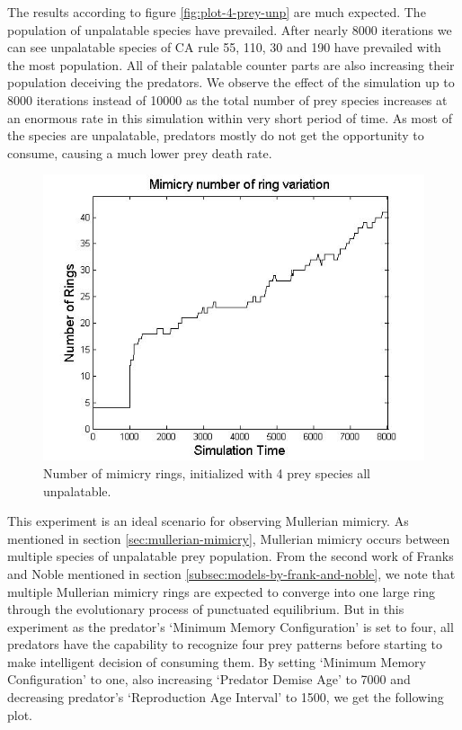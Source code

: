 \documentclass[letterpaper]{article}
\numberwithin{equation}{section}
\begin{document}
The results according to figure \ref{fig:plot-4-prey-unp} are much expected. The population of unpalatable species have prevailed. After nearly 8000 iterations we can see unpalatable species of CA rule 55, 110, 30 and 190 have prevailed with the most population. All of their palatable counter parts are also increasing their population deceiving the predators. We observe the effect of the simulation up to 8000 iterations instead of 10000 as the total number of prey species increases at an enormous rate in this simulation within very short period of time. As most of the species are unpalatable, predators mostly do not get the opportunity to consume, causing a much lower prey death rate. 

\begin{figure}[H]
	\centering
	\includegraphics[scale=0.50]{../tex/images/ringSize8k-4Prey-unp}
	\caption[Number of mimicry rings (4 prey species all unpalatable)]{Number of mimicry rings, initialized with 4 prey species all unpalatable.}
	\label{fig:ringSize10k-4-Prey-unp}
\end{figure}

This experiment is an ideal scenario for observing Mullerian mimicry. As mentioned in section \ref{sec:mullerian-mimicry}, Mullerian mimicry occurs between multiple species of unpalatable prey population. From the second work of Franks and Noble \cite{franks2003} mentioned in section \ref{subsec:models-by-frank-and-noble}, we note that multiple Mullerian mimicry rings are expected to converge into one large ring through the evolutionary process of punctuated equilibrium. But in this experiment as the predator's `Minimum Memory Configuration' is set to four, all predators have the capability to recognize four prey patterns before starting to make intelligent decision of consuming them. By setting `Minimum Memory Configuration' to one, also increasing `Predator Demise Age' to 7000 and decreasing predator's `Reproduction Age Interval' to 1500, we get the following plot. 
\end{document}
